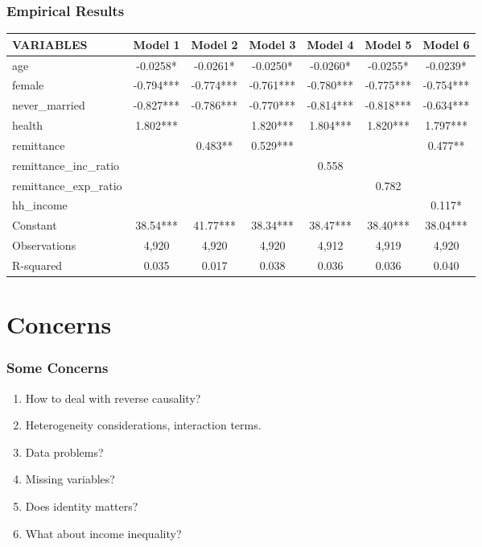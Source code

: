 \documentclass[10pt]{beamer}
\begin{document}
\begin{frame}[c]\frametitle{Empirical Results}

\begin{table}[htbp]
\scriptsize
  \centering
    \begin{tabular}{lcccccc}
    \toprule
    VARIABLES & Model 1 & Model 2 & Model 3 & Model 4 & Model 5 & Model 6 \\
    \midrule
    age   & -0.0258* & -0.0261* & -0.0250* & -0.0260* & -0.0255* & -0.0239* \\
    female & -0.794*** & -0.774*** & -0.761*** & -0.780*** & -0.775*** & -0.754*** \\
    never\_married & -0.827*** & -0.786*** & -0.770*** & -0.814*** & -0.818*** & -0.634*** \\
    health & 1.802*** &       & 1.820*** & 1.804*** & 1.820*** & 1.797*** \\
    remittance &       & 0.483** & 0.529*** &       &       & 0.477** \\
    remittance\_inc\_ratio &       &       &       & 0.558 &       &  \\
    remittance\_exp\_ratio &       &       &       &       & 0.782 &  \\
    hh\_income &       &       &       &       &       & 0.117* \\
    Constant & 38.54*** & 41.77*** & 38.34*** & 38.47*** & 38.40*** & 38.04*** \\
    Observations & 4,920 & 4,920 & 4,920 & 4,912 & 4,919 & 4,920 \\
    R-squared & 0.035 & 0.017 & 0.038 & 0.036 & 0.036 & 0.040 \\
    \bottomrule
    \end{tabular}%
  \label{tab:addlabel}%
\end{table}%


\end{frame}

\section{Concerns}
\begin{frame}[c]\frametitle{Some Concerns}

\begin{enumerate}
\item How to deal with reverse causality?
\item Heterogeneity considerations, interaction terms.
\item Data problems?
\item Missing variables?
\item Does identity matters?
\item What about income inequality?
\end{enumerate}
\end{frame}
\end{document}
